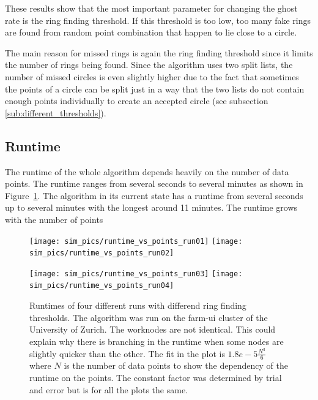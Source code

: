 \documentclass[11pt]{scrreprt}
\begin{document}
These results show that the most important parameter for changing the ghost rate is the ring finding threshold.
If this threshold is too low, too many fake rings are found from random point combination that happen to lie close to a circle.

The main reason for missed rings is again the ring finding threshold since it limits the number of rings
being found. Since the algorithm uses two split lists, the number of missed circles is even slightly higher due to the
fact that sometimes the points of a circle can be split just in a way that the two lists do not
contain enough points individually to create an accepted circle (see subsection \ref{sub:different_thresholds}).
\subsection{Runtime} %
\label{sub:runtime}

The runtime of the whole algorithm depends heavily on the number of data points. The runtime ranges from several seconds to 
several minutes as shown in Figure~\ref{fig:runtime}. The algorithm in its current state has a runtime from several seconds up
to several minutes with the longest around 11 minutes. The runtime grows with the number of points

\begin{figure}[tb]
  \centering
  \texttt{[image: sim\_pics/runtime\_vs\_points\_run01]}%
  \texttt{[image: sim\_pics/runtime\_vs\_points\_run02]}

  \texttt{[image: sim\_pics/runtime\_vs\_points\_run03]}%
  \texttt{[image: sim\_pics/runtime\_vs\_points\_run04]}
  \caption[Runtimes of four different runs]{Runtimes of four different runs with differend ring finding thresholds. The algorithm was run on the farm-ui cluster of the
  University of Zurich. The worknodes are not identical. This could explain why there is branching in the runtime when some 
  nodes are slightly quicker than the other. The fit in the plot is $1.8e{-}5\frac{N^3}{6}$ where $N$ is the number of data points
  to show the dependency of the runtime on the points. The constant factor was determined by trial and error but is for all the plots
  the same.}
  \label{fig:runtime}
\end{figure}

\end{document}
